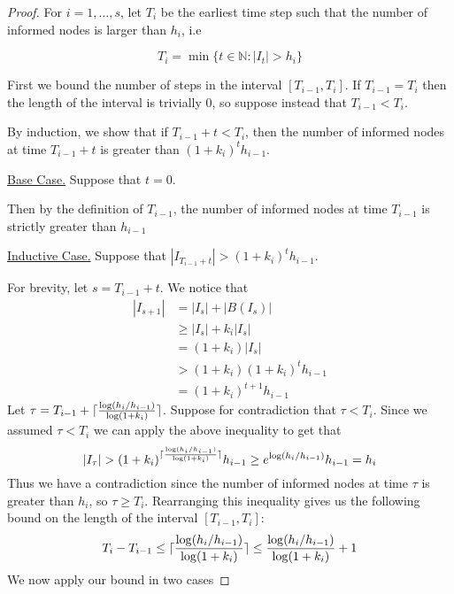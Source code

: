 \documentclass[a4paper,11pt]{article}
\theoremstyle{definition}
\DeclarePairedDelimiter\ceil{\lceil}{\rceil}
\begin{document}

\begin{proof}
	For $i = 1,\dots, s$, let $T_i$ be the earliest time step such that the number of informed nodes is larger than $h_i$, i.e

	$$
		T_i = \min \{ t \in \mathbb{N} : |I_t| > h_i \}
	$$

	First we bound the number of steps in the interval $[T_{i-1}, T_i]$. If $T_{i-1} = T_i$ then the length of the interval is trivially 0, so suppose instead that $T_{i-1} < T_i$.

	By induction, we show that if $T_{i-1} + t < T_i$, then the number of informed nodes at time $T_{i-1} + t$ is greater than $(1+k_i)^t h_{i-1}$.
	
	\underline{Base Case.} Suppose that $t=0$. 
	
	Then by the definition of $T_{i-1}$, the number of informed nodes at time $T_{i-1}$ is strictly greater than $h_{i-1}$

	\underline{Inductive Case.} Suppose that $|I_{T_{i-1} + t}| > (1+k_i)^t h_{i-1}$.

	For brevity, let $s = T_{i-1} + t$. We notice that 
	\begin{align*}
		|I_{s+1}| &= |I_s| + |B(I_s)| \\ %
		& \geq |I_s| + k_i |I_s| \\ %
		& = (1 + k_i)|I_s| \\
		& > (1 + k_i)(1+k_i)^t h_{i-1} \\ %
		& = (1+k_i)^{t+1} h_{i-1}
	\end{align*}
	Let $\tau = T_{i-1} + \ceil{ \frac{\log (h_i/h_{i-1})}{\log(1+k_i)}}$. 
	Suppose for contradiction that $\tau < T_i$. %
	Since we assumed $\tau < T_i$ we can apply the above inequality %
	to get that 
	$$
		|I_\tau| > 
		(1+k_i)^{\ceil{ \frac{\log (h_i/h_{i-1})}{\log(1+k_i)}}} h_{i-1}
		\geq e^{\log (h_i/h_{i-1})} h_{i-1}
		= h_i
	$$
	Thus we have a contradiction since the number of informed nodes at time $\tau$ is greater than $h_i$, so $\tau \geq T_i$. Rearranging this inequality gives us the following bound on the length of the interval $[T_{i-1}, T_i]$:
	\begin{equation} \label{eq:FloodingSingleStepBound}
		T_i - T_{i-1} \leq \ceil{ \frac{\log (h_i/h_{i-1})}{\log(1+k_i)}} \leq \frac{\log (h_i/h_{i-1})}{\log(1+k_i)} + 1
	\end{equation}
	We now apply our bound in two cases


\end{proof}
\end{document}
